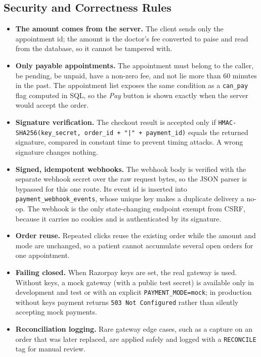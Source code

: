 \subsection{Security and Correctness Rules}

\begin{itemize}
    \item \textbf{The amount comes from the server.} The client sends only the appointment id; the amount is the doctor's fee converted to paise and read from the database, so it cannot be tampered with.
    \item \textbf{Only payable appointments.} The appointment must belong to the caller, be pending, be unpaid, have a non-zero fee, and not lie more than 60 minutes in the past. The appointment list exposes the same condition as a \texttt{can\_pay} flag computed in SQL, so the \emph{Pay} button is shown exactly when the server would accept the order.
    \item \textbf{Signature verification.} The checkout result is accepted only if \texttt{HMAC-SHA256(key\_secret, order\_id + "|" + payment\_id)} equals the returned signature, compared in constant time to prevent timing attacks. A wrong signature changes nothing.
    \item \textbf{Signed, idempotent webhooks.} The webhook body is verified with the separate webhook secret over the raw request bytes, so the JSON parser is bypassed for this one route. Its event id is inserted into \texttt{payment\_webhook\_events}, whose unique key makes a duplicate delivery a no-op. The webhook is the only state-changing endpoint exempt from CSRF, because it carries no cookies and is authenticated by its signature.
    \item \textbf{Order reuse.} Repeated clicks reuse the existing order while the amount and mode are unchanged, so a patient cannot accumulate several open orders for one appointment.
    \item \textbf{Failing closed.} When Razorpay keys are set, the real gateway is used. Without keys, a mock gateway (with a public test secret) is available only in development and test or with an explicit \texttt{PAYMENT\_MODE=mock}; in production without keys payment returns \texttt{503 Not Configured} rather than silently accepting mock payments.
    \item \textbf{Reconciliation logging.} Rare gateway edge cases, such as a capture on an order that was later replaced, are applied safely and logged with a \texttt{RECONCILE} tag for manual review.
\end{itemize}

